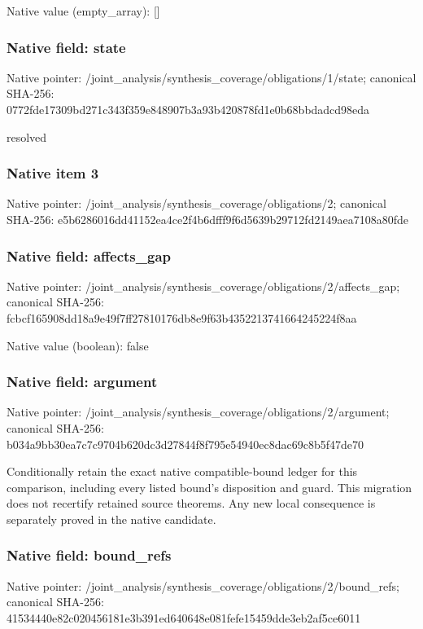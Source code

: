 \documentclass[10pt,a4paper]{article}
\begin{document}
Native value (empty\_\allowbreak{}array): []

\subsubsection{Native field: state}
Native pointer: /joint\_\allowbreak{}analysis/synthesis\_\allowbreak{}coverage/obligations/1/state; canonical SHA-256: 0772fde17309bd271c343f359e848907b3a93b420878fd1e0b68bbdadcd98eda

\begingroup\raggedright\sloppy resolved\par\endgroup

\subsubsection{Native item 3}
Native pointer: /joint\_\allowbreak{}analysis/synthesis\_\allowbreak{}coverage/obligations/2; canonical SHA-256: e5b6286016dd41152ea4ce2f4b6dfff9f6d5639b29712fd2149aea7108a80fde

\subsubsection{Native field: affects\_\allowbreak{}gap}
Native pointer: /joint\_\allowbreak{}analysis/synthesis\_\allowbreak{}coverage/obligations/2/affects\_\allowbreak{}gap; canonical SHA-256: fcbcf165908dd18a9e49f7ff27810176db8e9f63b4352213741664245224f8aa

Native value (boolean): false

\subsubsection{Native field: argument}
Native pointer: /joint\_\allowbreak{}analysis/synthesis\_\allowbreak{}coverage/obligations/2/argument; canonical SHA-256: b034a9bb30ea7c7c9704b620dc3d27844f8f795e54940ec8dac69c8b5f47de70

\begingroup\raggedright\sloppy Conditionally retain the exact native compatible-bound ledger for this comparison,\allowbreak{} including every listed bound's disposition and guard. This migration does not recertify retained source theorems. Any new local consequence is separately proved in the native candidate.\par\endgroup

\subsubsection{Native field: bound\_\allowbreak{}refs}
Native pointer: /joint\_\allowbreak{}analysis/synthesis\_\allowbreak{}coverage/obligations/2/bound\_\allowbreak{}refs; canonical SHA-256: 41534440e82c020456181e3b391ed640648e081fefe15459dde3eb2af5ce6011
\end{document}
